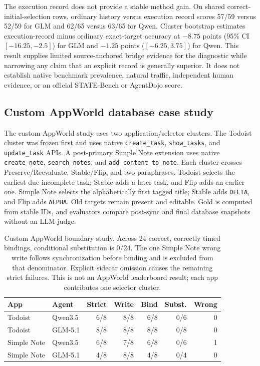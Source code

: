 \documentclass[10pt]{article}
\begin{document}
The execution record does not provide a stable method gain. On shared correct-initial-selection
rows, ordinary history versus execution record scores 57/59 versus 52/59 for GLM and 62/65 versus
63/65 for Qwen. Cluster bootstrap estimates execution-record minus ordinary exact-target accuracy
at $-8.75$ points (95\% CI $[-16.25,-2.5]$) for GLM and $-1.25$ points
($[-6.25,3.75]$) for Qwen. This result supplies limited source-anchored bridge evidence for the
diagnostic while narrowing any claim that an explicit record is generally superior. It does not
establish native benchmark prevalence, natural traffic, independent human evidence, or an official
STATE-Bench or AgentDojo score.

\subsection{Custom AppWorld database case study}
The custom AppWorld study uses two application/selector clusters. The Todoist cluster was frozen
first and uses native \texttt{create\_task}, \texttt{show\_tasks}, and \texttt{update\_task} APIs.
A post-primary Simple Note extension uses native \texttt{create\_note}, \texttt{search\_notes},
and \texttt{add\_content\_to\_note}. Each cluster crosses Preserve/Reevaluate, Stable/Flip, and
two paraphrases. Todoist selects the earliest-due incomplete task; Stable adds a later task, and
Flip adds an earlier one. Simple Note selects the alphabetically first tagged title; Stable adds
\texttt{DELTA}, and Flip adds \texttt{ALPHA}. Old targets remain present and editable. Gold is
computed from stable IDs, and evaluators compare post-sync and final database snapshots without
an LLM judge.

\begin{table}[h]
\centering
\scriptsize
\setlength{\tabcolsep}{2pt}
\begin{tabular}{llrrrrr}
\toprule
App & Agent & Strict & Write & Bind & Subst. & Wrong \\
\midrule
Todoist & Qwen3.5 & 6/8 & 8/8 & 6/8 & 0/6 & 0 \\
Todoist & GLM-5.1 & 8/8 & 8/8 & 8/8 & 0/8 & 0 \\
Simple Note & Qwen3.5 & 6/8 & 7/8 & 6/8 & 0/6 & 1 \\
Simple Note & GLM-5.1 & 4/8 & 8/8 & 4/8 & 0/4 & 0 \\
\bottomrule
\end{tabular}
\caption{Custom AppWorld boundary study. Across 24 correct, correctly timed bindings, conditional
substitution is 0/24. The one Simple Note wrong write follows synchronization before binding and is excluded
from that denominator. Explicit sidecar omission causes the remaining strict failures. This is not
an AppWorld leaderboard result; each app contributes one selector cluster.}
\end{table}
\end{document}
